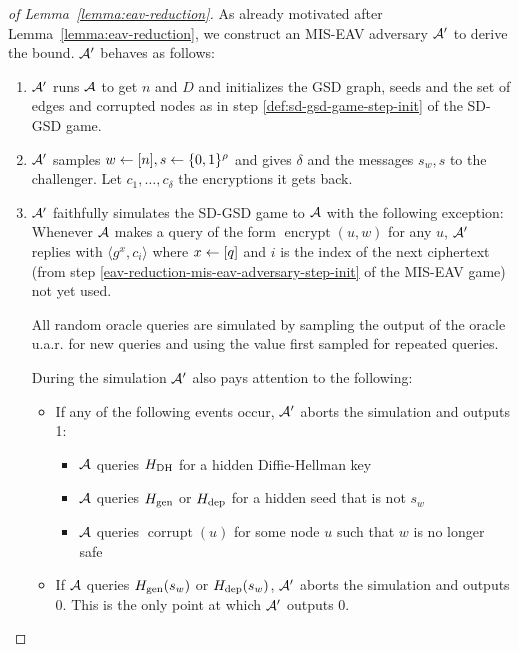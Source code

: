 \begin{proof}[of Lemma~\ref{lemma:eav-reduction}]
	As already motivated after Lemma~\ref{lemma:eav-reduction}, we construct an MIS-EAV adversary $\mathcal{A}'$ to derive the bound. $\mathcal{A}'$ behaves as follows:
	\begin{enumerate}[1.]
		\item $\mathcal{A}'$ runs $\mathcal{A}$ to get $n$ and $D$ and initializes the GSD graph, seeds and the set of edges and corrupted nodes as in step \ref{def:sd-gsd-game-step-init} of the SD-GSD game.
		\item \label{eav-reduction-mis-eav-adversary-step-init} $\mathcal{A}'$ samples $w \leftarrow [n], s \leftarrow \{0, 1\}^\rho$ and gives $\delta$ and the messages $s_w, s$ to the challenger. Let $c_1, \ldots, c_\delta$ the encryptions it gets back.
		\item $\mathcal{A}'$ faithfully simulates the SD-GSD game to $\mathcal{A}$ with the following exception: Whenever $\mathcal{A}$ makes a query of the form $\operatorname{encrypt}(u, w)$ for any $u$, $\mathcal{A}'$ replies with $\langle g^x, c_i \rangle$ where $x \leftarrow [q]$ and $i$ is the index of the next ciphertext (from step \ref{eav-reduction-mis-eav-adversary-step-init} of the MIS-EAV game) not yet used.

		      All random oracle queries are simulated by sampling the output of the oracle u.a.r. for new queries and using the value first sampled for repeated queries.

		      During the simulation $\mathcal{A}'$ also pays attention to the following:
		      \begin{itemize}
			      \item If any of the following events occur, $\mathcal{A}'$ aborts the simulation and outputs 1:
			            \begin{itemize}
				            \item $\mathcal{A}$ queries $H_\mathrm{DH}$ for a hidden Diffie-Hellman key
				            \item $\mathcal{A}$ queries $H_\mathrm{gen}$ or $H_\mathrm{dep}$ for a hidden seed that is not $s_w$
				            \item $\mathcal{A}$ queries $\operatorname{corrupt}(u)$ for some node $u$ such that $w$ is no longer safe
			            \end{itemize}
			      \item If $\mathcal{A}$ queries $H_\mathrm{gen}(s_w)$ or $H_\mathrm{dep}(s_w)$, $\mathcal{A}'$ aborts the simulation and outputs 0. This is the only point at which $\mathcal{A}'$ outputs 0.
		      \end{itemize}


\end{enumerate}
\end{proof}
